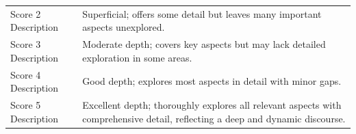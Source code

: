 \begin{tabular}{ll}
Score 2 Description  & Superficial; offers some detail but leaves many important aspects unexplored.                                                                    \\
Score 3 Description  & Moderate depth; covers key aspects but may lack detailed exploration in some areas.                                                   \\
Score 4 Description  & Good depth; explores most aspects in detail with minor gaps.                                                                   \\
Score 5 Description  & Excellent depth; thoroughly explores all relevant aspects with comprehensive detail, reflecting a deep and dynamic discourse.                               \\
\bottomrule
\end{tabular}